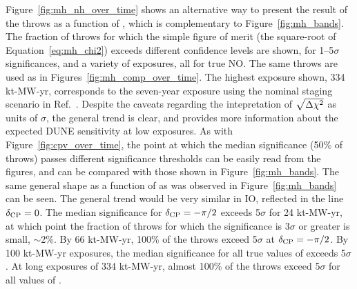 Figure~\ref{fig:mh_nh_over_time} shows an alternative way to present the result of the throws as a function of \deltacp, which is complementary to Figure~\ref{fig:mh_bands}. The fraction of throws for which the simple figure of merit (the square-root of Equation~\ref{eq:mh_chi2}) exceeds different confidence levels are shown, for 1--5$\sigma$ significances, and a variety of exposures, all for true NO. The same throws are used as in Figures~\ref{fig:mh_comp_over_time}. The highest exposure shown, 334 kt-MW-yr, corresponds to the seven-year exposure using the nominal staging scenario in Ref.~\cite{Abi:2020qib}. Despite the caveats regarding the intepretation of $\sqrt{\Delta\chi^{2}}$ as units of $\sigma$, the general trend is clear, and provides more information about the expected DUNE sensitivity at low exposures. As with Figure~\ref{fig:cpv_over_time}, the point at which the median significance (50\% of throws) passes different significance thresholds can be easily read from the figures, and can be compared with those shown in Figure~\ref{fig:mh_bands}. The same general shape as a function of \deltacp as was observed in Figure~\ref{fig:mh_bands} can be seen. The general trend would be very similar in IO, reflected in the line $\delta_{\rm CP} = 0$. The median significance for $\delta_{\rm CP} = -\pi/2$ exceeds 5$\sigma$ for 24 kt-MW-yr, at which point the fraction of throws for which the significance is 3$\sigma$ or greater is small, $\sim$2\%. By 66 kt-MW-yr, 100\% of the throws exceed 5$\sigma$ at $\delta_{\rm CP} = -\pi/2$. By 100 kt-MW-yr exposures, the median significance for all true values of \deltacp exceeds 5$\sigma$. At long exposures of 334 kt-MW-yr, almost 100\% of the throws exceed 5$\sigma$ for all values of \deltacp.

